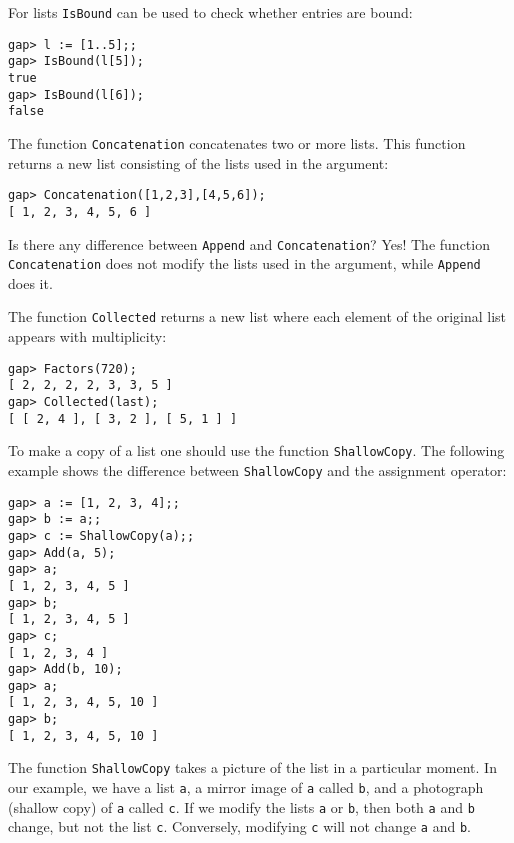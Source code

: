 For lists \lstinline{IsBound} can be used to 
check whether entries are bound:
\begin{lstlisting}
gap> l := [1..5];;
gap> IsBound(l[5]);
true
gap> IsBound(l[6]);
false
\end{lstlisting}

The function \lstinline{Concatenation} concatenates 
two or more lists. This function returns a new list 
consisting of the lists used in the argument:
\begin{lstlisting}
gap> Concatenation([1,2,3],[4,5,6]);
[ 1, 2, 3, 4, 5, 6 ]
\end{lstlisting}

\begin{remark}
  Is there any difference between \lstinline{Append} and
  \lstinline{Concatenation}? Yes!  The function \lstinline{Concatenation} does
  not modify the lists used in the argument, while
  \lstinline{Append} does it.
\end{remark}

The function \lstinline{Collected} returns a new list where each element 
of the original list appears with multiplicity:
\begin{lstlisting}
gap> Factors(720);
[ 2, 2, 2, 2, 3, 3, 5 ]
gap> Collected(last);
[ [ 2, 4 ], [ 3, 2 ], [ 5, 1 ] ]
\end{lstlisting}

To make a copy of a list one should use the function \lstinline{ShallowCopy}.
The following example shows the difference between \lstinline{ShallowCopy} and
the assignment operator:
\begin{lstlisting}
gap> a := [1, 2, 3, 4];;
gap> b := a;;
gap> c := ShallowCopy(a);;
gap> Add(a, 5);
gap> a;
[ 1, 2, 3, 4, 5 ]
gap> b;
[ 1, 2, 3, 4, 5 ]
gap> c;
[ 1, 2, 3, 4 ]
gap> Add(b, 10);
gap> a;
[ 1, 2, 3, 4, 5, 10 ]
gap> b;
[ 1, 2, 3, 4, 5, 10 ]
\end{lstlisting}

\begin{remark}
The function \lstinline{ShallowCopy} takes a picture
of the list in a particular moment. 
In our example, we have a list \lstinline{a}, a mirror image of \lstinline{a} called \lstinline{b},
and a photograph (shallow copy) of \lstinline{a}
called \lstinline{c}. If we modify the lists \lstinline{a} or
\lstinline{b}, then both \lstinline{a} and \lstinline{b}
change, but not the list \lstinline{c}.
Conversely, modifying
\lstinline{c} will not change \lstinline{a} and \lstinline{b}.
\end{remark}

